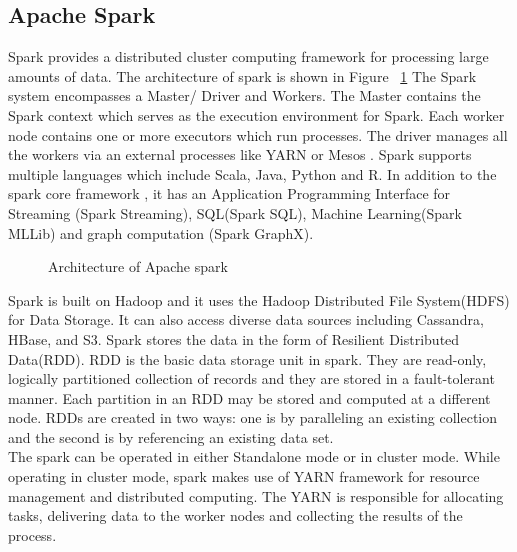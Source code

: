 \documentclass[9pt,twocolumn,twoside]{styles/osajnl}
\begin{document}
\subsection{Apache Spark}
Spark provides a distributed cluster computing framework for processing large amounts of data. The architecture of spark is shown in Figure ~\ref{fig:spark_arch}
The  Spark system encompasses a Master/ Driver and Workers. The Master contains the Spark context which serves as the execution environment for Spark. Each worker node contains one or more executors which run processes. The driver manages all the workers via an external processes like YARN or Mesos \cite{www-apache_spark}. 
Spark supports multiple languages which include Scala, Java, Python and R. In addition to the spark core framework , it has an Application Programming Interface for Streaming (Spark Streaming), SQL(Spark SQL), Machine Learning(Spark MLLib) and graph computation (Spark GraphX). \\
\begin{figure}[htbp]
\centering
{}
\caption{Architecture of Apache spark}
\label{fig:spark_arch}
\end{figure}
Spark is built on Hadoop and it uses the Hadoop Distributed File System(HDFS) for Data Storage. It can also access diverse data sources including Cassandra, HBase, and S3. Spark stores the data in the form of Resilient Distributed Data(RDD). RDD is the basic data storage unit in spark. They are read-only, logically partitioned collection of records and they are stored in a fault-tolerant manner.  Each partition in an RDD may be stored and computed at a different node. RDDs are created in two ways: one is by paralleling an existing collection and the second is by referencing an existing data set\cite{www-RDD}.\\
The spark can be operated in either Standalone mode or in cluster mode. While operating in cluster mode, spark makes use of YARN framework for resource management and distributed computing. The YARN is responsible for allocating tasks, delivering data to the worker nodes and collecting the results of the process. 
\end{document}
